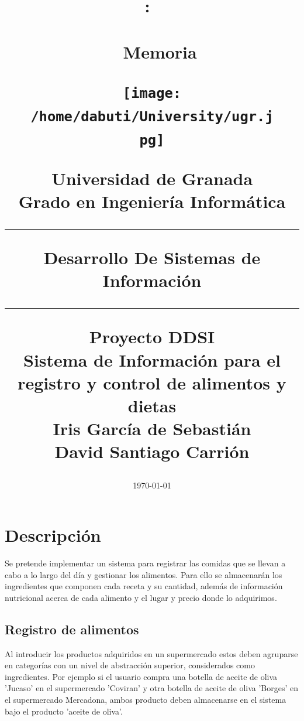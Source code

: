 \documentclass[a4paper,12pt]{report}
\title{
\vspace{2in}
\textmd{\textbf{\hmwkClass:\ \hmwkTitle}}\\
\normalsize\vspace{0.1in}\small{\hmwkDueDate}\\
\vspace{0.1in}\large{\textit{\hmwkClassInstructor\ }}
\vspace{3in}
}
\author{\textbf{\hmwkAuthorName}}
\date{}
\date{\today}
\title{Memoria}
\newcommand{\hmwkTitle}{Proyecto DDSI}
\newcommand{\hmwkTitleExtended}{Sistema de Información para el registro y control de alimentos y dietas}
\newcommand{\hmwkClass}{Desarrollo De Sistemas de Información}
\begin{document}
\title{
\begin{center}
\vspace*{-2.5cm}
\begin{figure}[htb]
\begin{center}
\texttt{[image: /home/dabuti/University/ugr.jpg]}
\end{center}
\end{figure}
\end{center}
\Huge{\textbf{Universidad de Granada}}\\
\vspace{1cm}
\Huge{\textbf{Grado en Ingeniería Informática}}\\
\vspace{2cm}
\hrule{}
\vspace{0.3cm}
\textbf{\hmwkClass}\\
\vspace{0.3cm}
\hrule{}
\vspace{2cm}
\textbf{\hmwkTitle}\\
\vspace{1cm}
\textbf{\hmwkTitleExtended}\\
\vspace{1.5cm}
\textbf{\small{Iris García de Sebastián}}\\
\textbf{\small{David Santiago Carrión}}\\
\vspace{0.1cm}
}

\maketitle
\clearpage
\tableofcontents
\clearpage

\chapter{Descripción}
\label{sec-1}
Se pretende implementar un sistema para registrar las comidas que se
llevan a cabo a lo largo del día y gestionar los alimentos. Para
ello se almacenarán los ingredientes que componen cada receta y su
cantidad, además de información nutricional acerca de cada alimento
y el lugar y precio donde lo adquirimos.


\section{Registro de alimentos}
\label{sec-1-1}
Al introducir los productos adquiridos en un supermercado estos
deben agruparse en categorías con un nivel de abstracción
superior, considerados como ingredientes. Por ejemplo si el
usuario compra una botella de aceite  de oliva 'Jucaso' en el
supermercado 'Coviran' y otra botella de aceite de oliva 'Borges'
en el supermercado Mercadona, ambos producto deben almacenarse en
el sistema bajo el producto 'aceite de oliva'.
\end{document}
